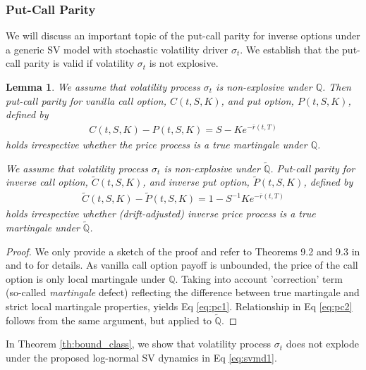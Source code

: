 \documentclass[11pt,a4paper] {article}
\newtheorem{lemma}{Lemma}[section]
\begin{document}
\subsubsection{Put-Call Parity}
We will discuss an important topic of the put-call parity for inverse options under a generic SV model with stochastic volatility driver $\sigma_{t}$. We establish that the put-call parity is valid if volatility $\sigma_{t}$ is not explosive.
\begin{lemma}\label{lem:put_call}
We assume that volatility process $\sigma_t$ is non-explosive under $\mathbb{Q}$. Then put-call parity for vanilla call option, $C(t, S, K)$, and put option, $P(t, S, K)$, defined by
\begin{equation} \label{eq:pc1}
\begin{split}
C(t, S, K)-P(t, S, K)= S -Ke^{-\bar r(t,T)}
\end{split}
\end{equation}
holds irrespective whether the price process is a true martingale under $\mathbb{Q}$.

We assume that volatility process $\sigma_t$ is non-explosive under $\tilde{\mathbb{Q}}$.  Put-call parity for inverse call option, $\tilde{C}(t, S, K)$, and inverse put option, $\tilde{P}(t, S, K)$, defined by
\begin{equation} \label{eq:pc2}
\begin{split}
\tilde{C}(t, S, K)-\tilde{P}(t, S, K)= 1-S^{-1}Ke^{-\bar r(t,T)}
\end{split}
\end{equation}
holds irrespective whether (drift-adjusted) inverse price process is a true martingale under $\tilde{\mathbb{Q}}$.
\end{lemma}

\begin{proof}
We only provide a sketch of the proof and refer to Theorems 9.2 and 9.3 in \cite{Lewis2000} and to \cite{Sin1998} for details.
As vanilla call option payoff is unbounded, the price of the call option is only local martingale under $\mathbb{Q}$. Taking into account 'correction' term (so-called {\it martingale} defect) reflecting the difference between true martingale and strict local martingale properties, yields Eq \eqref{eq:pc1}. Relationship in Eq \eqref{eq:pc2} follows from the same argument, but applied to $\tilde{\mathbb{Q}}$. 
\end{proof}

In Theorem \ref{th:bound_class}, we show that volatility process $\sigma_t$ does not explode under the proposed log-normal SV dynamics in Eq \eqref{eq:svmd1}.
\end{document}
